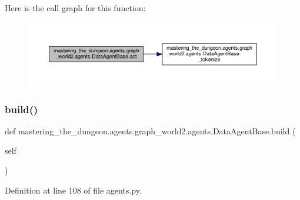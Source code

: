 Here is the call graph for this function\+:
\nopagebreak
\begin{figure}[H]
\begin{center}
\leavevmode
\includegraphics[width=350pt]{classmastering__the__dungeon_1_1agents_1_1graph__world2_1_1agents_1_1DataAgentBase_a21a502f34655840f3bdb22551e48450b_cgraph}
\end{center}
\end{figure}
\mbox{\label{classmastering__the__dungeon_1_1agents_1_1graph__world2_1_1agents_1_1DataAgentBase_a05f05160a9624af190be6eea457d8fe4}} 
\subsubsection{\texorpdfstring{build()}{build()}}
{\footnotesize\ttfamily def mastering\+\_\+the\+\_\+dungeon.\+agents.\+graph\+\_\+world2.\+agents.\+Data\+Agent\+Base.\+build (\begin{DoxyParamCaption}\item[{}]{self }\end{DoxyParamCaption})}



Definition at line 108 of file agents.\+py.



